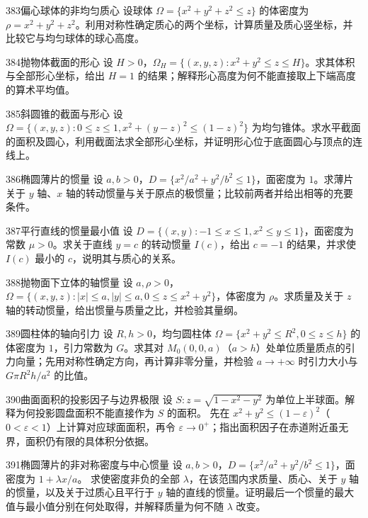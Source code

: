 \begin{exercise}{383}{偏心球体的非均匀质心}
设球体 $\Omega=\{x^2+y^2+z^2\leq z\}$ 的体密度为 $\rho=x^2+y^2+z^2$。利用对称性确定质心的两个坐标，计算质量及质心竖坐标，并比较它与均匀球体的球心高度。
\end{exercise}

\begin{exercise}{384}{抛物体截面的形心}
设 $H>0$，$\Omega_H=\{(x,y,z):x^2+y^2\leq z\leq H\}$。求其体积与全部形心坐标，给出 $H=1$ 的结果；解释形心高度为何不能直接取上下端高度的算术平均值。
\end{exercise}

\begin{exercise}{385}{斜圆锥的截面与形心}
设 $\Omega=\{(x,y,z):0\leq z\leq1,x^2+(y-z)^2\leq(1-z)^2\}$ 为均匀锥体。求水平截面的面积及圆心，利用截面法求全部形心坐标，并证明形心位于底面圆心与顶点的连线上。
\end{exercise}

\begin{exercise}{386}{椭圆薄片的惯量}
设 $a,b>0$，$D=\{x^2/a^2+y^2/b^2\leq1\}$，面密度为 $1$。求薄片关于 $y$ 轴、$x$ 轴的转动惯量与关于原点的极惯量；比较前两者并给出相等的充要条件。
\end{exercise}

\begin{exercise}{387}{平行直线的惯量最小值}
设 $D=\{(x,y):-1\leq x\leq1,x^2\leq y\leq1\}$，面密度为常数 $\mu>0$。求关于直线 $y=c$ 的转动惯量 $I(c)$，给出 $c=-1$ 的结果，并求使 $I(c)$ 最小的 $c$，说明其与质心的关系。
\end{exercise}

\begin{exercise}{388}{抛物面下立体的轴惯量}
设 $a,\rho>0$，$\Omega=\{(x,y,z):|x|\leq a,|y|\leq a,0\leq z\leq x^2+y^2\}$，体密度为 $\rho$。求质量及关于 $z$ 轴的转动惯量，给出惯量与质量之比，并检验其量纲。
\end{exercise}

\begin{exercise}{389}{圆柱体的轴向引力}
设 $R,h>0$，均匀圆柱体 $\Omega=\{x^2+y^2\leq R^2,0\leq z\leq h\}$ 的体密度为 $1$，引力常数为 $G$。求其对 $M_0(0,0,a)$（$a>h$）处单位质量质点的引力向量；先用对称性确定方向，再计算非零分量，并检验 $a\to+\infty$ 时引力大小与 $G\pi R^2h/a^2$ 的比值。
\end{exercise}

\begin{exercise}{390}{曲面面积的投影因子与边界极限}
设 $S:z=\sqrt{1-x^2-y^2}$ 为单位上半球面。解释为何投影圆盘面积不能直接作为 $S$ 的面积。
先在 $x^2+y^2\leq(1-\varepsilon)^2$（$0<\varepsilon<1$）上计算对应球面面积，再令 $\varepsilon\to0^+$；指出面积因子在赤道附近虽无界，面积仍有限的具体积分依据。
\end{exercise}

\begin{exercise}{391}{椭圆薄片的非对称密度与中心惯量}
设 $a,b>0$，$D=\{x^2/a^2+y^2/b^2\leq1\}$，面密度为 $1+\lambda x/a$。
求使密度非负的全部 $\lambda$，在该范围内求质量、质心、关于 $y$ 轴的惯量，以及关于过质心且平行于 $y$ 轴的直线的惯量。证明最后一个惯量的最大值与最小值分别在何处取得，并解释质量为何不随 $\lambda$ 改变。
\end{exercise}
